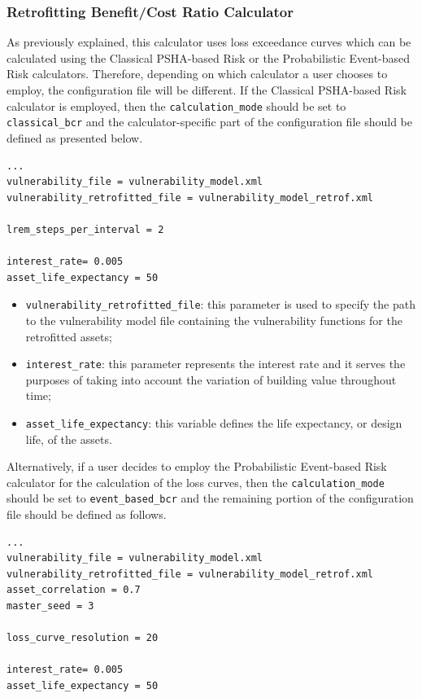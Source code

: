 \subsubsection{Retrofitting Benefit/Cost Ratio Calculator}
As previously explained, this calculator uses loss exceedance curves which can be calculated using the Classical PSHA-based Risk or the Probabilistic Event-based Risk calculators. Therefore, depending on which calculator a user chooses to employ, the configuration file will be different. If the Classical PSHA-based Risk calculator is employed, then the \Verb+calculation_mode+ should be set to \texttt{clas\-si\-cal\_bcr} and the calculator-specific part of the configuration file should be defined as presented below.

\begin{Verbatim}[frame=single, commandchars=\\\{\}, samepage=true]
...
vulnerability_file = vulnerability_model.xml
vulnerability_retrofitted_file = vulnerability_model_retrof.xml

lrem_steps_per_interval = 2

interest_rate= 0.005
asset_life_expectancy = 50
\end{Verbatim}

\begin{itemize}
\item  \Verb+vulnerability_retrofitted_file+: this parameter is used to specify the path to the \gls{vulnerability model} file containing the \glspl{vulnerability function} for the retrofitted assets;  
\item  \Verb+interest_rate+: this parameter represents the interest rate and it serves the purposes of taking into account the variation of building value throughout time;
\item  \Verb+asset_life_expectancy+: this variable defines the life expectancy, or design life, of the assets.
\end{itemize}

Alternatively, if a user decides to employ the Probabilistic Event-based Risk calculator for the calculation of the loss curves, then the \Verb+calculation_mode+ should be set to \Verb+event_based_bcr+ and the remaining portion of the configuration file should be defined as follows.

\begin{Verbatim}[frame=single, commandchars=\\\{\}, samepage=true]
...
vulnerability_file = vulnerability_model.xml
vulnerability_retrofitted_file = vulnerability_model_retrof.xml
asset_correlation = 0.7
master_seed = 3

loss_curve_resolution = 20

interest_rate= 0.005
asset_life_expectancy = 50
\end{Verbatim}
